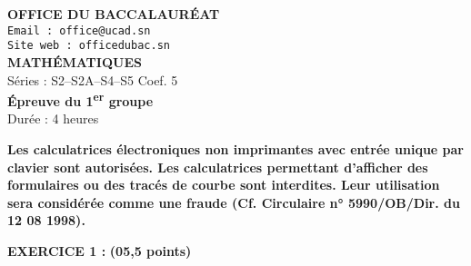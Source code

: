 \documentclass[11pt]{article}
\begin{document}
\begin{center}
    \textbf{\Large OFFICE DU BACCALAURÉAT} \\
    \texttt{Email : office@ucad.sn} \\
    \texttt{Site web : officedubac.sn} \\
    \vspace{0.3cm}
    \textbf{\LARGE MATHÉMATIQUES} \\
    \vspace{0.2cm}
    Séries : S2–S2A–S4–S5 \hfill Coef. 5 \\
    \textbf{Épreuve du 1\textsuperscript{er} groupe} \\
    Durée : 4 heures
\end{center}

\vspace{0.2cm}
\noindent
\textbf{Les calculatrices électroniques non imprimantes avec entrée unique par clavier sont autorisées. Les calculatrices permettant d’afficher des formulaires ou des tracés de courbe sont interdites. Leur utilisation sera considérée comme une fraude (Cf. Circulaire n° 5990/OB/Dir. du 12 08 1998).}

\vspace{0.5cm}
\noindent
\textbf{EXERCICE 1 :}  \textbf{(05,5 points)}
\end{document}
